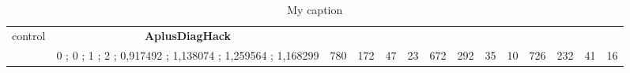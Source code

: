 \begin{table}[]
{\begin{tabular}{|c|c|c|c|c|c|c|c|c|c|c|c|c|c|}
control & \cellcolor{blue!15}\textbf{AplusDiagHack}& {\color[HTML]{00009B} } & {\color[HTML]{9A0000} } & {\color[HTML]{009901} } &  & {\color[HTML]{00009B} } & {\color[HTML]{9A0000} } & {\color[HTML]{009901} } &  & {\color[HTML]{00009B} } & {\color[HTML]{9A0000} } & {\color[HTML]{009901} } &  \\ 
 & \cellcolor{ blue!15}0 ; 0 ; 1 ; 2 ; 0,917492 ; 1,138074 ; 1,259564 ; 1,168299 & \multirow{-2}{*}{{\color[HTML]{00009B} 780}} & \multirow{-2}{*}{{\color[HTML]{9A0000} 172}} & \multirow{-2}{*}{{\color[HTML]{009901} 47}} & \multirow{-2}{*}{23} & \multirow{-2}{*}{{\color[HTML]{00009B} 672}} & \multirow{-2}{*}{{\color[HTML]{9A0000} 292}} & \multirow{-2}{*}{{\color[HTML]{009901} 35}} & \multirow{-2}{*}{10} & \multirow{-2}{*}{{\color[HTML]{00009B} 726}} & \multirow{-2}{*}{{\color[HTML]{9A0000} 232}} & \multirow{-2}{*}{{\color[HTML]{009901} 41}} & \multirow{-2}{*}{16} \\ \hline
\end{tabular}} \caption{ My caption} \label{ my - label} \end{table}
